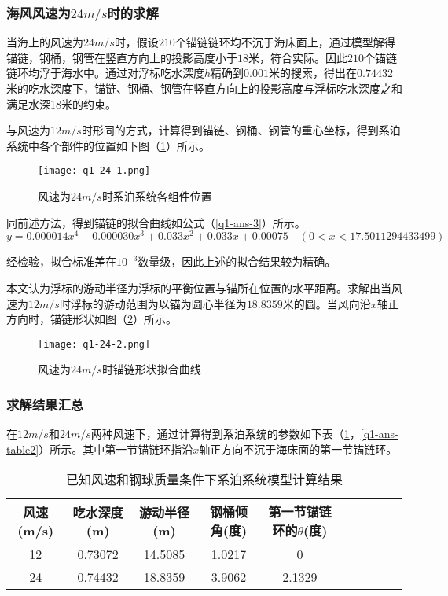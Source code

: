 \documentclass[withoutpreface,bwprint]{cumcmthesis} %
\begin{document}
\subsubsection{海风风速为$24m/s$时的求解}
\par 当海上的风速为$24m/s$时，假设$210$个锚链链环均不沉于海床面上，通过模型解得锚链，钢桶，钢管在竖直方向上的投影高度小于$18$米，符合实际。因此$210$个锚链链环均浮于海水中。通过对浮标吃水深度$h$精确到$0.001$米的搜索，得出在$0.74432$米的吃水深度下，锚链、钢桶、钢管在竖直方向上的投影高度与浮标吃水深度之和满足水深18米的约束。


\par 与风速为$12m/s$时形同的方式，计算得到锚链、钢桶、钢管的重心坐标，得到系泊系统中各个部件的位置如下图（\ref{fig:q1-24-1}）所示。
\begin{figure}[h]
\small
\centering
\texttt{[image: q1-24-1.png]}
\caption{风速为$24m/s$时系泊系统各组件位置} \label{fig:q1-24-1}
\end{figure}
\par 同前述方法，得到锚链的拟合曲线如公式（\ref{q1-ans-3}）所示。
\begin{equation}
	\label{q1-ans-3}
y = 0.000014x^4 -0.000030x^3+0.033x^2+0.033x+0.00075 \quad (0<x< 17.5011294433499)
\end{equation}
\par 经检验，拟合标准差在$10^{-3}$数量级，因此上述的拟合结果较为精确。
\par 本文认为浮标的游动半径为浮标的平衡位置与锚所在位置的水平距离。求解出当风速为$12m/s$时浮标的游动范围为以锚为圆心半径为$18.8359$米的圆。当风向沿$x$轴正方向时，锚链形状如图（\ref{fig:q1-24-2}）所示。
\begin{figure}[h]
\small
\centering
\texttt{[image: q1-24-2.png]}
\caption{风速为$24m/s$时锚链形状拟合曲线} \label{fig:q1-24-2}
\end{figure}

\newpage
\subsubsection{求解结果汇总}
在$12m/s$和$24m/s$两种风速下，通过计算得到系泊系统的参数如下表（\ref{q1-ans-table}，\ref{q1-ans-table2}）所示。其中第一节锚链环指沿$x$轴正方向不沉于海床面的第一节锚链环。
\begin{table}[!htbp]
\centering
\caption{已知风速和钢球质量条件下系泊系统模型计算结果}
\label{q1-ans-table}
\begin{tabular}{cccccccccc}
\toprule
风速(m/s)& 吃水深度(m)& 游动半径(m)& 钢桶倾角(度)& 第一节锚链环的$\theta$(度) \\
\midrule
12 & 0.73072 & 14.5085 & 1.0217 & 0 \\
24 & 0.74432 & 18.8359 & 3.9062 & 2.1329 \\ 
\bottomrule 
\end{tabular}
\end{table}
\end{document}
